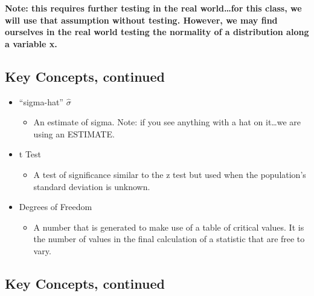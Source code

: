 \documentclass[]{article}
\begin{document}
\textbf{Note: this requires further testing in the real world\ldots{}for
this class, we will use that assumption without testing. However, we may
find ourselves in the real world testing the normality of a distribution
along a variable x.}

\subsection{Key Concepts, continued}\label{key-concepts-continued-1}

\begin{itemize}
\itemsep1pt\parskip0pt
\item
  ``sigma-hat'' $\hat{\sigma}$

  \begin{itemize}
  \itemsep1pt\parskip0pt
  \item
    An estimate of sigma. Note: if you see anything with a hat on
    it\ldots{}we are using an ESTIMATE.
  \end{itemize}
\item
  t Test

  \begin{itemize}
  \itemsep1pt\parskip0pt
  \item
    A test of significance similar to the z test but used when the
    population's standard deviation is unknown.
  \end{itemize}
\item
  Degrees of Freedom

  \begin{itemize}
  \itemsep1pt\parskip0pt
  \item
    A number that is generated to make use of a table of critical
    values. It is the number of values in the final calculation of a
    statistic that are free to vary.
  \end{itemize}
\end{itemize}

\subsection{Key Concepts, continued}\label{key-concepts-continued-2}
\end{document}
